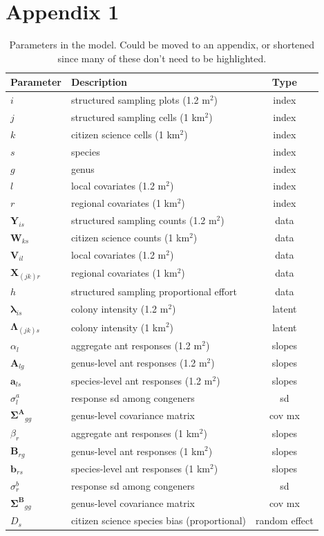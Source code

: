 \documentclass[preprint,review,times,12pt,3p]{elsarticle}
\begin{document}
\section{Appendix 1}
\begin{table}[ht]
	\centering
	\begin{tabular}{ l l c }
		\hline
		\textbf{Parameter} & \textbf{Description} & \textbf{Type} \\
		\hline
		$i$ & structured sampling plots (1.2 m$^2$) & index \\
		$j$ & structured sampling cells (1 km$^2$) & index \\
		$k$ & citizen science cells (1 km$^2$) & index \\
		$s$ & species & index \\
		$g$ & genus & index \\
		$l$ & local covariates (1.2 m$^2$) & index \\
		$r$ & regional covariates (1 km$^2$) & index \\
		\hline
		$\mathbf{Y}_{is}$ & structured sampling counts (1.2 m$^2$) & data \\
		$\mathbf{W}_{ks}$ & citizen science counts (1 km$^2$) & data \\
		$\mathbf{V}_{il}$ & local covariates (1.2 m$^2$) & data \\
		$\mathbf{X}_{(jk)r}$ & regional covariates (1 km$^2$) & data \\
		$h$ & structured sampling proportional effort & data \\
		\hline
		$\mathbf{\lambda}_{is}$ & colony intensity (1.2 m$^2$) & latent \\
		$\mathbf{\Lambda}_{(jk)s}$ & colony intensity (1 km$^2$) & latent \\
		\hline
		$\alpha_{l}$ & aggregate ant responses (1.2 m$^2$) & slopes \\
		$\mathbf{A}_{lg}$ & genus-level ant responses (1.2 m$^2$) & slopes \\
		$\mathbf{a}_{ls}$ & species-level ant responses (1.2 m$^2$) & slopes \\
		$\sigma^a_{l}$ & response sd among congeners & sd \\
		$\mathbf{\Sigma^A}_{gg}$ & genus-level covariance matrix & cov mx \\
		$\beta_{r}$ & aggregate ant responses (1 km$^2$) & slopes \\
		$\mathbf{B}_{rg}$ & genus-level ant responses (1 km$^2$) & slopes \\
		$\mathbf{b}_{rs}$ & species-level ant responses (1 km$^2$) & slopes \\
		$\sigma^b_{r}$ & response sd among congeners & sd \\
		$\mathbf{\Sigma^B}_{gg}$ & genus-level covariance matrix & cov mx \\
		$D_{s}$ & citizen science species bias (proportional) & random effect \\
	\end{tabular}
	\caption{\label{table:params} Parameters in the model. Could be moved to an appendix, or shortened since many of these don't need to be highlighted. }
\end{table}
\end{document}

